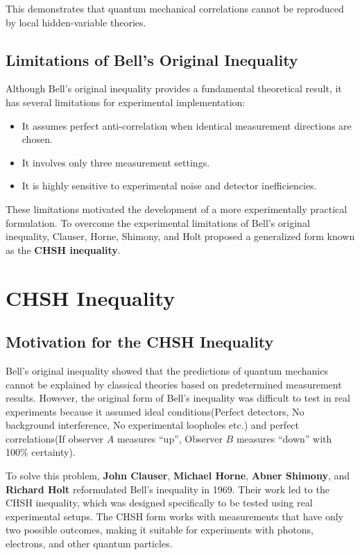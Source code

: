 \documentclass[14pt,a4paper]{extarticle}
\begin{document}
This demonstrates that quantum mechanical correlations cannot be reproduced by local hidden-variable theories.


\subsection{Limitations of Bell's Original Inequality}

Although Bell’s original inequality provides a fundamental theoretical result, it has several limitations for experimental implementation:

\begin{itemize}
\item It assumes perfect anti-correlation when identical measurement directions are chosen.
\item It involves only three measurement settings.
\item It is highly sensitive to experimental noise and detector inefficiencies.
\end{itemize}

These limitations motivated the development of a more experimentally practical formulation. To overcome the experimental limitations of Bell’s original inequality, Clauser, Horne, Shimony, and Holt proposed a generalized form known as the \textbf{CHSH inequality}.

\section{CHSH Inequality}
\subsection{Motivation for the CHSH Inequality}
Bell’s original inequality showed that the predictions of quantum mechanics cannot be explained by classical theories based on predetermined measurement results. However, the original form of Bell’s inequality was difficult to test in real experiments because it assumed ideal conditions(Perfect detectors, No background interference, No experimental loopholes etc.) and perfect correlations(If observer $A$ measures “up”, Observer $B$ measures “down” with 100\% certainty).

To solve this problem, \textbf{John Clauser}, \textbf{Michael Horne}, \textbf{Abner Shimony}, and \textbf{Richard Holt} reformulated Bell’s inequality in 1969. Their work led to the CHSH inequality, which was designed specifically to be tested using real experimental setups. The CHSH form works with measurements that have only two possible outcomes, making it suitable for experiments with photons, electrons, and other quantum particles.
\end{document}
